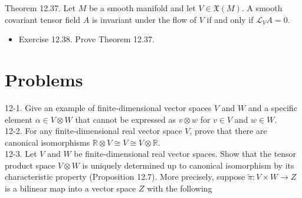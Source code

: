 \documentclass[10pt, letterpaper]{article}
\begin{document}
Theorem 12.37. Let $M$ be a smooth manifold and let $V \in \mathfrak{X}(M)$. A smooth covariant tensor field $A$ is invariant under the flow of $V$ if and only if $\mathscr{L}_{V} A=0$.

\begin{itemize}
  \item Exercise 12.38. Prove Theorem 12.37.
\end{itemize}

\section*{Problems}
12-1. Give an example of finite-dimensional vector spaces $V$ and $W$ and a specific element $\alpha \in V \otimes W$ that cannot be expressed as $v \otimes w$ for $v \in V$ and $w \in W$.\\
12-2. For any finite-dimensional real vector space $V$, prove that there are canonical isomorphisms $\mathbb{R} \otimes V \cong V \cong V \otimes \mathbb{R}$.\\
12-3. Let $V$ and $W$ be finite-dimensional real vector spaces. Show that the tensor product space $V \otimes W$ is uniquely determined up to canonical isomorphism by its characteristic property (Proposition 12.7). More precisely, suppose $\tilde{\pi}: V \times W \rightarrow Z$ is a bilinear map into a vector space $Z$ with the following
\end{document}
